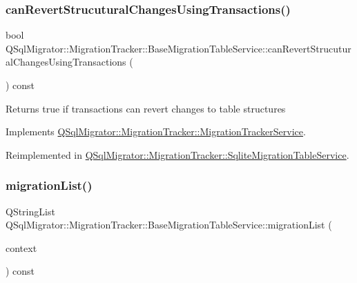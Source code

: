 \subsubsection{\texorpdfstring{can\+Revert\+Strucutural\+Changes\+Using\+Transactions()}{canRevertStrucuturalChangesUsingTransactions()}}
{\footnotesize\ttfamily bool Q\+Sql\+Migrator\+::\+Migration\+Tracker\+::\+Base\+Migration\+Table\+Service\+::can\+Revert\+Strucutural\+Changes\+Using\+Transactions (\begin{DoxyParamCaption}{ }\end{DoxyParamCaption}) const\hspace{0.3cm}{\ttfamily [virtual]}}

\begin{DoxyReturn}{Returns}
true if transactions can revert changes to table structures 
\end{DoxyReturn}


Implements \hyperlink{class_q_sql_migrator_1_1_migration_tracker_1_1_migration_tracker_service_a539b5fe686ffd6ae6577c046201f0df3}{Q\+Sql\+Migrator\+::\+Migration\+Tracker\+::\+Migration\+Tracker\+Service}.



Reimplemented in \hyperlink{class_q_sql_migrator_1_1_migration_tracker_1_1_sqlite_migration_table_service_a6d2f747ce2a599033dee174f8e996fff}{Q\+Sql\+Migrator\+::\+Migration\+Tracker\+::\+Sqlite\+Migration\+Table\+Service}.

\mbox{\label{class_q_sql_migrator_1_1_migration_tracker_1_1_base_migration_table_service_a1105240b456db9f85c2fc2866582a292}} 
\subsubsection{\texorpdfstring{migration\+List()}{migrationList()}}
{\footnotesize\ttfamily Q\+String\+List Q\+Sql\+Migrator\+::\+Migration\+Tracker\+::\+Base\+Migration\+Table\+Service\+::migration\+List (\begin{DoxyParamCaption}\item[{const \hyperlink{class_q_sql_migrator_1_1_command_execution_1_1_command_execution_context}{Command\+Execution\+::\+Command\+Execution\+Context} \&}]{context }\end{DoxyParamCaption}) const\hspace{0.3cm}{\ttfamily [virtual]}}


